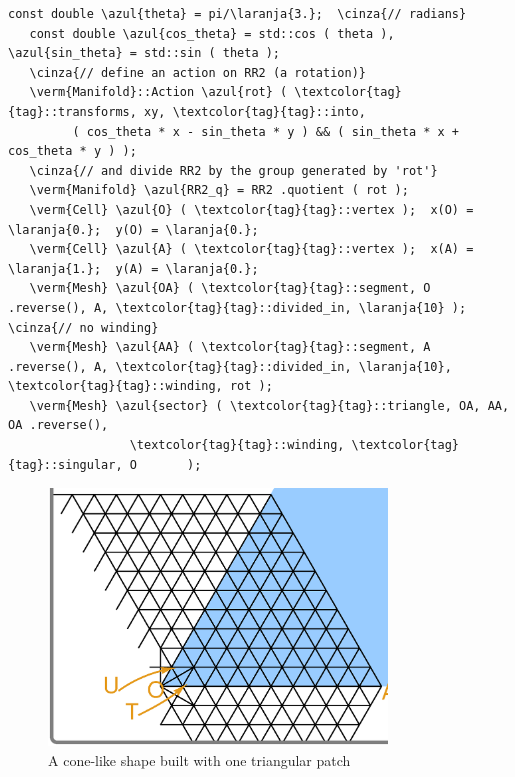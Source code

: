\begin{Verbatim}[commandchars=\\\{\},formatcom=\small\tt,frame=single,
   label=parag-\ref{\numb section 7.\numb parag 16}.cpp,rulecolor=\color{moldura},
   baselinestretch=0.94,framesep=2mm                                             ]
   const double \azul{theta} = pi/\laranja{3.};  \cinza{// radians}
   const double \azul{cos_theta} = std::cos ( theta ), \azul{sin_theta} = std::sin ( theta );
   \cinza{// define an action on RR2 (a rotation)}
   \verm{Manifold}::Action \azul{rot} ( \textcolor{tag}{tag}::transforms, xy, \textcolor{tag}{tag}::into,
         ( cos_theta * x - sin_theta * y ) && ( sin_theta * x + cos_theta * y ) );
   \cinza{// and divide RR2 by the group generated by 'rot'}
   \verm{Manifold} \azul{RR2_q} = RR2 .quotient ( rot );
   \verm{Cell} \azul{O} ( \textcolor{tag}{tag}::vertex );  x(O) = \laranja{0.};  y(O) = \laranja{0.};
   \verm{Cell} \azul{A} ( \textcolor{tag}{tag}::vertex );  x(A) = \laranja{1.};  y(A) = \laranja{0.};
   \verm{Mesh} \azul{OA} ( \textcolor{tag}{tag}::segment, O .reverse(), A, \textcolor{tag}{tag}::divided_in, \laranja{10} );  \cinza{// no winding}
   \verm{Mesh} \azul{AA} ( \textcolor{tag}{tag}::segment, A .reverse(), A, \textcolor{tag}{tag}::divided_in, \laranja{10}, \textcolor{tag}{tag}::winding, rot );
   \verm{Mesh} \azul{sector} ( \textcolor{tag}{tag}::triangle, OA, AA, OA .reverse(),
                 \textcolor{tag}{tag}::winding, \textcolor{tag}{tag}::singular, O       );
\end{Verbatim}

\begin{figure}[ht] \centering
  \includegraphics[width=90mm]{sector-cut.eps}
  \caption{A cone-like shape built with one triangular patch}
  \label{\numb section 7.\numb fig 12}
\end{figure}


